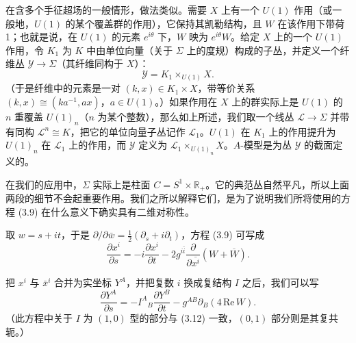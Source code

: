 \documentclass[11pt,a4paper,UTF8]{ctexart}
\theoremstyle{plain}
\theoremstyle{definition}
\begin{document}
在含多个手征超场的一般情形，做法类似。需要 $X$ 上有一个 $U(1)$ 作用（或一般地，$U(1)$ 的某个覆盖群的作用），它保持其凯勒结构，且 $W$ 在该作用下带荷 1；也就是说，在 $U(1)$ 的元素 $e^{i\theta}$ 下，$W$ 映为 $e^{i\theta}W$。给定 $X$ 上的一个 $U(1)$ 作用，令 $K_1$ 为 $K$ 中由单位向量（关于 $\Sigma$ 上的度规）构成的子丛，并定义一个纤维丛 $\mathcal{Y}\to\Sigma$（其纤维同构于 $X$）：
\begin{equation}
    \mathcal{Y}=K_1\times_{U(1)}X.
    \tag{3.11}
\end{equation}
（于是纤维中的元素是一对 $(k,x)\in K_1\times X$，带等价关系 $(k,x)\cong(ka^{-1},ax)$，$a\in U(1)$。）如果作用在 $X$ 上的群实际上是 $U(1)$ 的 $n$ 重覆盖 $U(1)_n$（$n$ 为某个整数），那么如上所述，我们取一个线丛 $\mathcal{L}\to\Sigma$ 并带有同构 $\mathcal{L}^n\cong K$，把它的单位向量子丛记作 $\mathcal{L}_1$。$U(1)$ 在 $K_1$ 上的作用提升为 $U(1)_n$ 在 $\mathcal{L}_1$ 上的作用，而 $\mathcal{Y}$ 定义为 $\mathcal{L}_1\times_{U(1)_n}X$。$A$-模型是为丛 $\mathcal{Y}$ 的截面定义的。

在我们的应用中，$\Sigma$ 实际上是柱面 $C=S^1\times\mathbb{R}_+$。它的典范丛自然平凡，所以上面两段的细节不会起重要作用。我们之所以解释它们，是为了说明我们所将使用的方程 (3.9) 在什么意义下确实具有二维对称性。

取 $w=s+it$，于是 $\partial/\partial\bar w=\frac12\left(\partial_s+i\partial_t\right)$，方程 (3.9) 可写成
\begin{equation}
    \frac{\partial x^i}{\partial s}=-i\frac{\partial x^i}{\partial t}-2g^{i\bar i}\frac{\partial}{\partial\overline{x^i}}\left(W+\overline{W}\right).
    \tag{3.12}
\end{equation}


把 $x^i$ 与 $\bar x^i$ 合并为实坐标 $Y^A$，并把复数 $i$ 换成复结构 $I$ 之后，我们可以写
\begin{equation}
    \frac{\partial Y^A}{\partial s}=-I^A{}_B\frac{\partial Y^B}{\partial t}-g^{AB}\partial_B(4\,\mathrm{Re}\,W).
    \tag{3.13}
\end{equation}
（此方程中关于 $I$ 为 $(1,0)$ 型的部分与 (3.12) 一致，$(0,1)$ 部分则是其复共轭。）
\end{document}
